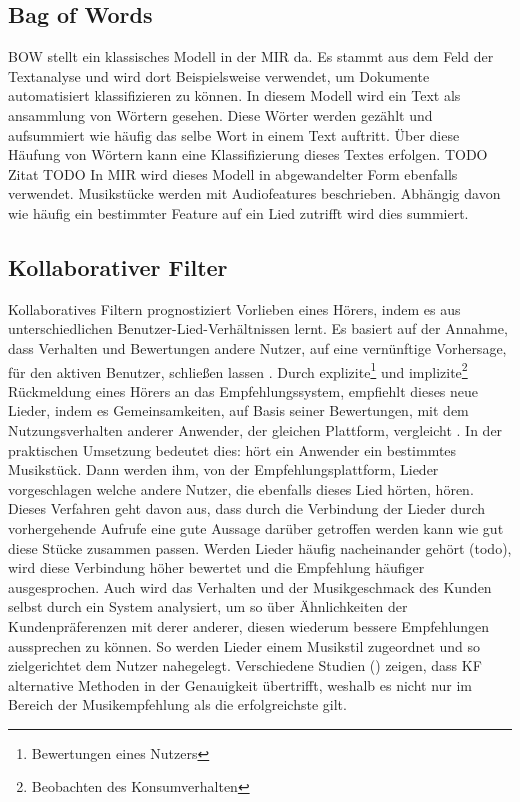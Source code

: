 \documentclass[twosided,a4,10pt]{article}
\begin{document}
\begin{multicols}{2}
		\subsection{Bag of Words}
		BOW stellt ein klassisches Modell in der MIR da. Es stammt aus dem Feld der Textanalyse und wird dort Beispielsweise verwendet, um Dokumente automatisiert klassifizieren zu können. In diesem Modell wird ein Text als ansammlung von Wörtern gesehen. Diese Wörter werden gezählt und aufsummiert wie häufig das selbe Wort in einem Text auftritt. Über diese Häufung von Wörtern kann eine Klassifizierung dieses Textes erfolgen. TODO Zitat TODO In MIR wird dieses Modell in abgewandelter Form ebenfalls verwendet. Musikstücke werden mit Audiofeatures beschrieben. Abhängig davon wie häufig ein bestimmter Feature auf ein Lied zutrifft wird dies summiert.
		\subsection{Kollaborativer Filter}
		Kollaboratives Filtern prognostiziert Vorlieben eines Hörers, indem es aus unterschiedlichen Benutzer-Lied-Verhältnissen lernt. Es basiert auf der Annahme, dass Verhalten und Bewertungen andere Nutzer, auf eine vernünftige Vorhersage, für den aktiven Benutzer, schließen lassen \cite{celma}. Durch explizite\footnote[4]{ Bewertungen eines Nutzers} und implizite\footnote[5]{Beobachten des Konsumverhalten} Rückmeldung eines Hörers an das Empfehlungssystem, empfiehlt dieses neue Lieder, indem es Gemeinsamkeiten, auf Basis seiner Bewertungen, mit dem Nutzungsverhalten anderer Anwender, der gleichen Plattform, vergleicht \cite{mcfee}.\newline
		In der praktischen Umsetzung bedeutet dies: hört ein Anwender ein bestimmtes Musikstück. Dann werden ihm, von der Empfehlungsplattform, Lieder vorgeschlagen welche andere Nutzer, die ebenfalls dieses Lied hörten, hören. Dieses Verfahren geht davon aus, dass durch die Verbindung der Lieder durch vorhergehende Aufrufe eine gute Aussage darüber getroffen werden kann wie gut diese Stücke zusammen passen. Werden Lieder häufig nacheinander gehört (todo), wird diese Verbindung höher bewertet und die Empfehlung häufiger ausgesprochen. Auch wird das Verhalten und der Musikgeschmack des Kunden selbst durch ein System analysiert, um so über Ähnlichkeiten der Kundenpräferenzen mit derer anderer, diesen wiederum bessere Empfehlungen aussprechen zu können. So werden Lieder einem Musikstil zugeordnet und so zielgerichtet dem Nutzer nahegelegt.\newline
		Verschiedene Studien (\cite{mcfee}\cite{barrington}) zeigen, dass KF alternative Methoden in der Genauigkeit übertrifft, weshalb es nicht nur im Bereich der Musikempfehlung als die erfolgreichste gilt.\newline

\end{multicols}
\end{document}
